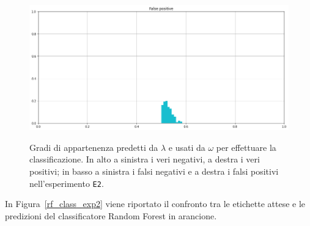 \documentclass[12pt]{report}
\theoremstyle{definition}
\begin{document}
\begin{figure}
   \begin{minipage}{0.48\textwidth}
     \includegraphics[width=\linewidth]{images/experiment_beta5_disgiunti/fp.png}\label{fp_b5d}
   \end{minipage}
   \caption{Gradi di appartenenza predetti da $\lambda$ e usati da $\omega$ per effettuare la classificazione. In alto a sinistra i veri negativi, a destra i veri positivi; in basso a sinistra i falsi negativi e a destra i falsi positivi nell'esperimento \texttt{E2}.}
   \label{4cases_exp2}
\end{figure}
In Figura~\ref{rf_class_exp2} viene riportato il confronto tra le etichette attese e le predizioni del classificatore Random Forest in arancione.
\end{document}
